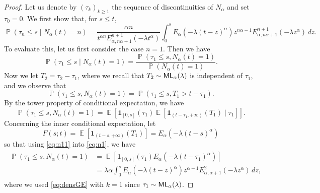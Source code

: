 \documentclass[]{amsart}
\numberwithin{equation}{section}
\theoremstyle{remark}
\theoremstyle{definition}
\DeclareMathOperator{\E}{\mathbb{E}}
\DeclareMathOperator{\bP}{\mathbb{P}}
\newcommand{\der}[2]{\frac{d #1}{d #2}}
\begin{document}
\begin{proof}
	Let us denote by $(\tau_k)_{k \ge 1}$ the sequence of discontinuities of $N_\alpha$ and set $\tau_0=0$. We first show that, for $s \le t$,
	\begin{equation}\label{eq:condlastjump}
		\bP(\tau_n \le s \mid N_\alpha(t)=n)=\frac{\alpha n}{t^{\alpha n}E_{\alpha,n\alpha+1}^{n+1}(-\lambda t^\alpha)} \int_0^s E_\alpha(-\lambda (t-z)^\alpha)z^{n\alpha-1}E_{\alpha,n\alpha+1}^{n+1}(-\lambda z^\alpha)\, dz.
	\end{equation}
	To evaluate this, let us first consider the case $n=1$. Then we have
	\begin{equation}\label{eq:n10}
		\bP(\tau_1 \le s \mid N_\alpha(t)=1)=\frac{\bP(\tau_1 \le s, N_\alpha(t)=1)}{\bP(N_\alpha(t)=1)}.
	\end{equation}
	Now we let $T_2=\tau_2-\tau_1$, where we recall that $T_2 \sim {\sf ML}_\alpha(\lambda)$ is independent of $\tau_1$, and we observe that
	\begin{equation*}
		\bP(\tau_1 \le s, N_\alpha(t)=1)=\bP(\tau_1 \le s, T_1 > t-\tau_1).
	\end{equation*}
	By the tower property of conditional expectation, we have
	\begin{equation}\label{eq:n1}
		\bP(\tau_1 \le s, N_\alpha(t)=1)=\E\left[\mathbf{1}_{[0,s]}(\tau_1)\E\left[\mathbf{1}_{(t-\tau_1,+\infty)}(T_1)\mid \tau_1\right]\right].
	\end{equation}
	Concerning the inner conditional expectation, let
	\begin{equation}\label{eq:n11}
		F(s;t)=\E\left[\mathbf{1}_{(t-s,+\infty)}(T_1)\right]=E_\alpha(-\lambda(t-s)^\alpha)
	\end{equation}
	so that using \eqref{eq:n11} into \eqref{eq:n1}, we have
	\begin{align}\label{eq:n13}
		\begin{split}
			\bP(\tau_1 \le s, N_\alpha(t)=1)&=\E\left[\mathbf{1}_{[0,s]}(\tau_1)E_\alpha(-\lambda(t-\tau_1)^\alpha)\right]\\
			&=\lambda \alpha \int_{0}^{s}E_\alpha(-\lambda(t-z)^\alpha)z^{\alpha-1}E^2_{\alpha,\alpha+1}(-\lambda z^\alpha)\, dz,	
		\end{split}
	\end{align}
	where we used \eqref{eq:densGE} with $k=1$ since $\tau_1 \sim {\sf ML}_\alpha(\lambda)$.

\end{proof}
\end{document}
